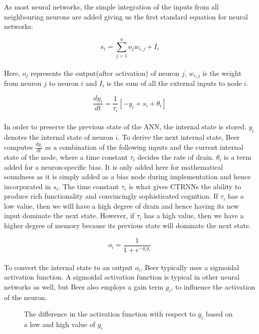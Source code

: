 As most neural networks, the simple integration of the inputs from all neighbouring neurons are added giving us the first standard equation for neural networks:

\begin{equation}
s_i = \sum_{j=1}^{n}o_{j}w_{i,j}+I_i
\end{equation}
\\
Here, $o_j$ represents the output(after activation) of neuron $j$, $w_{i,j}$ is the weight from neuron $j$ to neuron $i$ and $I_i$ is the sum of all the external inputs to node $i$.

\begin{equation}
\frac{dy_i}{dt} = \frac{1}{\tau_i}[-y_i + s_i + \theta_i]
\end{equation}
\\
In order to preserve the previous state of the ANN, the internal state is stored. 
$y_i$ denotes the internal state of neuron $i$.
To derive the next internal state, Beer computes $\frac{dy_i}{dt}$ as a combination of the following inputs and the current internal state of the node, where a time constant $\tau_i$ decides the rate of drain. 
$\theta_i$ is a term added for a neuron-specific bias.
It is only added here for mathematical soundness as it is simply added as a bias node during implementation and hence incorporated in $s_i$.
The time constant $\tau_i$ is what gives CTRNNs the ability to produce rich functionality and convincingly sophisticated cognition.
If $\tau_i$ has a low value, then we will have a high degree of drain and hence having its new input dominate the next state.
However, if $\tau_i$ has a high value, then we have a higher degree of memory because its previous state will dominate the next state.

\begin{equation}
o_i = \frac{1}{1 + e^{-g_{i}y_{i}}}
\end{equation}
\\
To convert the internal state to an output $o_i$, Beer typically uses a sigmoidal activation function.
A sigmoidal activation function is typical in other neural networks as well, but Beer also employs a gain term $g_i$, to influence the activation of the neuron.
\\
\begin{figure}[H]
	\centering
	\caption{The difference in the activation function with respect to $y_i$ based on a low and high value of $g_i$}
	\label{CTRNN-gGraph}
\end{figure}

